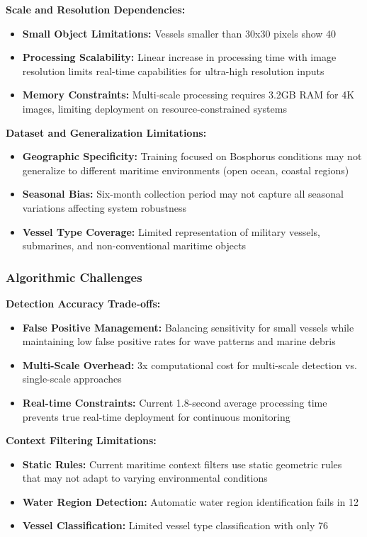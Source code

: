 \documentclass[a4paper,11pt]{article}
\begin{document}
\textbf{Scale and Resolution Dependencies:}
\begin{itemize}
    \item \textbf{Small Object Limitations:} Vessels smaller than 30x30 pixels show 40%
    \item \textbf{Processing Scalability:} Linear increase in processing time with image resolution limits real-time capabilities for ultra-high resolution inputs
    \item \textbf{Memory Constraints:} Multi-scale processing requires 3.2GB RAM for 4K images, limiting deployment on resource-constrained systems
\end{itemize}

\textbf{Dataset and Generalization Limitations:}
\begin{itemize}
    \item \textbf{Geographic Specificity:} Training focused on Bosphorus conditions may not generalize to different maritime environments (open ocean, coastal regions)
    \item \textbf{Seasonal Bias:} Six-month collection period may not capture all seasonal variations affecting system robustness
    \item \textbf{Vessel Type Coverage:} Limited representation of military vessels, submarines, and non-conventional maritime objects
\end{itemize}

\subsubsection{Algorithmic Challenges}

\textbf{Detection Accuracy Trade-offs:}
\begin{itemize}
    \item \textbf{False Positive Management:} Balancing sensitivity for small vessels while maintaining low false positive rates for wave patterns and marine debris
    \item \textbf{Multi-Scale Overhead:} 3x computational cost for multi-scale detection vs. single-scale approaches
    \item \textbf{Real-time Constraints:} Current 1.8-second average processing time prevents true real-time deployment for continuous monitoring
\end{itemize}

\textbf{Context Filtering Limitations:}
\begin{itemize}
    \item \textbf{Static Rules:} Current maritime context filters use static geometric rules that may not adapt to varying environmental conditions
    \item \textbf{Water Region Detection:} Automatic water region identification fails in 12%
    \item \textbf{Vessel Classification:} Limited vessel type classification with only 76%
\end{itemize}
\end{document}
